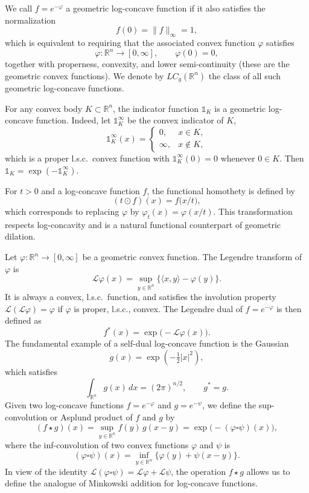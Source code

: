 \documentclass[11pt,leqno]{article}
\theoremstyle{definition}
\theoremstyle{remark}
\numberwithin{equation}{section}
\begin{document}
We call $f=e^{-\varphi}$ a geometric log-concave function if it also satisfies the normalization
$$f(0)=\|f\|_{\infty}=1,$$
which is equivalent to requiring that the associated convex function $\varphi$ satisfies
$$\varphi : \mathbb{R}^n \to [0,\infty], \qquad \varphi(0)=0,$$
together with properness, convexity, and lower semi-continuity (these are the geometric convex functions).
We denote by $LC_g(\mathbb{R}^n)$ the class of all such geometric log-concave functions.

For any convex body $K\subset\mathbb{R}^n$, the indicator function $\mathds{1}_K$ is a geometric log-concave function.
Indeed, let $\mathds{1}_K^\infty$ be the convex indicator of $K$,  
$$
\mathds{1}_K^\infty(x) = 
    \begin{cases}
        0, & x\in K, \\
        \infty, & x\notin K,
\end{cases}
$$
which is a proper l.s.c.\ convex function with $\mathds{1}_K^\infty(0)=0$ whenever $0\in K$.  
Then $\mathds{1}_K = \exp(-\mathds{1}_K^\infty)$.

\smallskip

For $t>0$ and a log-concave function $f$, the functional homothety is defined by
$$(t \odot f)(x) = f\big(x/t\big),$$
which corresponds to replacing $\varphi$ by $\varphi_t(x)= \varphi(x/t)$.
This transformation respects log-concavity and is a natural functional counterpart of geometric dilation.

\smallskip

Let $\varphi:\mathbb{R}^n\to[0,\infty]$ be a geometric convex function. The Legendre transform of $\varphi$ is
$$\mathcal{L}\varphi(x)= \sup_{y\in\mathbb{R}^n}\{ \langle x,y\rangle - \varphi(y)\}.$$
It is always a convex, l.s.c.\ function, and satisfies the involution property 
$\mathcal{L}(\mathcal{L}\varphi)=\varphi$ if $\varphi$ is proper, l.s.c., convex. 
The Legendre dual of $f=e^{-\varphi}$ is then defined as
$$f^{\ast}(x)=\exp\big(-\mathcal{L}\varphi(x)\big).$$
The fundamental example of a self-dual log-concave function is the Gaussian
$$g(x) = \exp\!\left(-\tfrac{1}{2}|x|^{2}\right),$$
which satisfies  
$$\int_{\mathbb{R}^n} g(x)\,dx = (2\pi)^{n/2}, \qquad g^{\ast}=g.$$
Given two log-concave functions $f=e^{-\varphi}$ and $g=e^{-\psi}$, we define the sup-convolution or 
Asplund product of $f$ and $g$ by
$$(f\star g)(x)= \sup_{y\in\mathbb{R}^n} f(y)\, g(x-y)= \exp\!\big(-(\varphi \square \psi)(x)\big),$$
where the inf-convolution of two convex functions $\varphi$ and $\psi$ is
$$(\varphi \square \psi)(x)=\inf_{y\in\mathbb{R}^n}\big\{\varphi(y)+\psi(x-y)\big\}.$$
In view of the identity $\mathcal{L}(\varphi\square\psi)=\mathcal{L}\varphi +\mathcal{L}\psi$,
the operation $f\star g$ allows us to define the analogue of Minkowski addition for log-concave functions.
\end{document}
